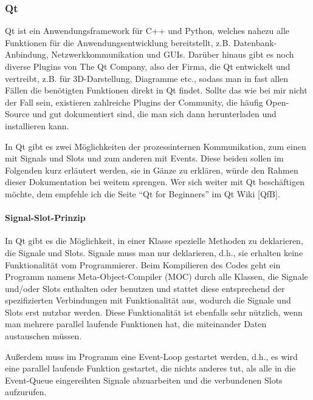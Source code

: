 \documentclass{article}
\begin{document}
    \subsubsection{Qt}\label{subsubsec:qt}

    Qt ist ein Anwendungsframework für C++ und Python, welches nahezu alle
    Funktionen für die Anwendungsentwicklung bereitstellt, z.B.
    Datenbank-Anbindung, Netzwerkkommunikation und GUIs. Darüber hinaus gibt
    es noch diverse Plugins von The Qt Company, also der Firma, die Qt
    entwickelt und vertreibt, z.B. für 3D-Darstellung, Diagramme etc.,
    sodass man in fast allen Fällen die benötigten Funktionen direkt in Qt
    findet. Sollte das wie bei mir nicht der Fall sein, existieren
    zahlreiche Plugins der Community, die häufig Open-Source und gut
    dokumentiert sind, die man sich dann herunterladen und installieren
    kann.

    In Qt gibt es zwei Möglichkeiten der prozessinternen Kommunikation, zum
    einen mit Signals und Slots und zum anderen mit Events. Diese beiden
    sollen im Folgenden kurz erläutert werden, sie in Gänze zu erklären,
    würde den Rahmen dieser Dokumentation bei weitem sprengen. Wer sich
    weiter mit Qt beschäftigen möchte, dem empfehle ich die Seite ``Qt for
    Beginners'' im Qt Wiki {[}QfB{]}.

    \paragraph{Signal-Slot-Prinzip}

    In Qt gibt es die Möglichkeit, in einer Klasse spezielle Methoden zu
    deklarieren, die Signale und Slots. Signale muss man nur deklarieren,
    d.h., sie erhalten keine Funktionalität vom Programmierer. Beim
    Kompilieren des Codes geht ein Programm namens Meta-Object-Compiler
    (MOC) durch alle Klassen, die Signale und/oder Slots enthalten oder
    benutzen und stattet diese entsprechend der spezifizierten Verbindungen
    mit Funktionalität aus, wodurch die Signale und Slots erst nutzbar
    werden. Diese Funktionalität ist ebenfalls sehr nützlich, wenn man
    mehrere parallel laufende Funktionen hat, die miteinander Daten
    austauschen müssen.

    Außerdem muss im Programm eine Event-Loop gestartet werden, d.h., es
    wird eine parallel laufende Funktion gestartet, die nichts anderes tut,
    als alle in die Event-Queue eingereihten Signale abzuarbeiten und die
    verbundenen Slots aufzurufen.
\end{document}
